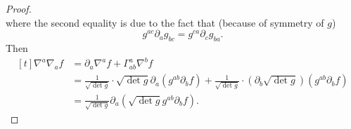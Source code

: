 \documentclass[titlepage,numbers=noenddot,oneside,%
cleardoublepage=empty,paper=a4,fontsize=11pt,%
english,%
]{scrartcl}
\begin{document}
\begin{proof}
\begin{equation*}
    \end{equation*}
    where the second equality is due to the fact that (because of symmetry of \( g \))
    \begin{equation*}
        g^{ac}\partial_{a}g_{bc}=g^{ca}\partial_c g_{ba}.
    \end{equation*}
    Then    
    \begin{equation*}
        \begin{aligned}[t]
            \nabla^a \nabla_a f&= \partial_a \nabla^a f+\Gamma^a_{ab} \nabla^b f\\
            &=\frac{1}{\sqrt{\det{g}}}\cdot \sqrt{\det{g}}\partial_a(g^{ab} \partial_b f)+\frac{1}{\sqrt{\det{g}}}\cdot (\partial_b \sqrt{\det{g}})(g^{ab}\partial_b f)\\
            &=\frac{1}{\sqrt{\det{g}}}\partial_a(\sqrt{\det{g}}g^{ab}\partial_b f).
        \end{aligned}
    \end{equation*}
\end{proof}
\end{document}
